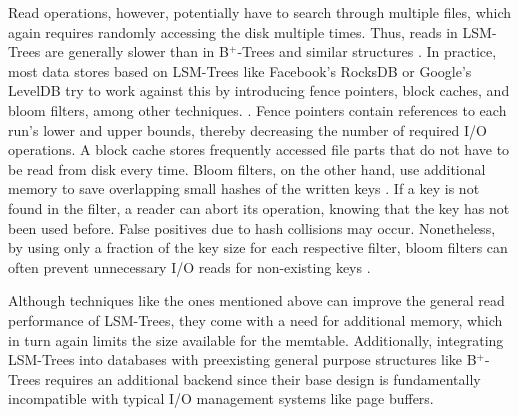 Read operations, however, potentially have to search through multiple files, which again requires randomly accessing the disk multiple times. Thus, reads in LSM-Trees are generally slower than in B$^+$-Trees and similar structures \cite{lsm_b_tree}. In practice, most data stores based on LSM-Trees like Facebook's RocksDB \cite{rocksdb} or Google's LevelDB \cite{leveldb} try to work against this by introducing fence pointers, block caches, and bloom filters, among other techniques. \cite{monkey,lsm_data_stores_leveldb_rocksdb}. Fence pointers contain references to each run's lower and upper bounds, thereby decreasing the number of required I/O operations. A block cache stores frequently accessed file parts that do not have to be read from disk every time.\newline 
Bloom filters, on the other hand, use additional memory to save overlapping small hashes of the written keys \cite{bloom_filter}. If a key is not found in the filter, a reader can abort its operation, knowing that the key has not been used before. False positives due to hash collisions may occur. Nonetheless, by using only a fraction of the key size for each respective filter, bloom filters can often prevent unnecessary I/O reads for non-existing keys \cite{bloom_filter}.

Although techniques like the ones mentioned above can improve the general read performance of LSM-Trees, they come with a need for additional memory, which in turn again limits the size available for the memtable. Additionally, integrating LSM-Trees into databases with preexisting general purpose structures like B$^+$-Trees requires an additional backend since their base design is fundamentally incompatible with typical I/O management systems like page buffers.